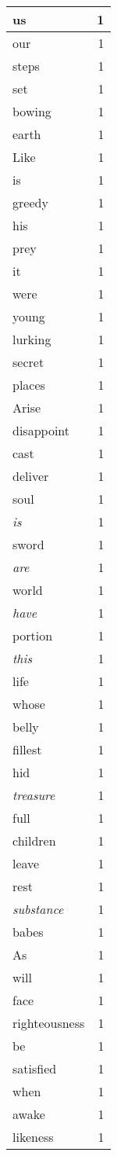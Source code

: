\begin{center}
\begin{longtable}{l|r}
us & 1\\ \hline 
our & 1\\ \hline 
steps & 1\\ \hline 
set & 1\\ \hline 
bowing & 1\\ \hline 
earth & 1\\ \hline 
Like & 1\\ \hline 
is & 1\\ \hline 
greedy & 1\\ \hline 
his & 1\\ \hline 
prey & 1\\ \hline 
it & 1\\ \hline 
were & 1\\ \hline 
young & 1\\ \hline 
lurking & 1\\ \hline 
secret & 1\\ \hline 
places & 1\\ \hline 
Arise & 1\\ \hline 
disappoint & 1\\ \hline 
cast & 1\\ \hline 
deliver & 1\\ \hline 
soul & 1\\ \hline 
\emph{is} & 1\\ \hline 
sword & 1\\ \hline 
\emph{are} & 1\\ \hline 
world & 1\\ \hline 
\emph{have} & 1\\ \hline 
portion & 1\\ \hline 
\emph{this} & 1\\ \hline 
life & 1\\ \hline 
whose & 1\\ \hline 
belly & 1\\ \hline 
fillest & 1\\ \hline 
hid & 1\\ \hline 
\emph{treasure} & 1\\ \hline 
full & 1\\ \hline 
children & 1\\ \hline 
leave & 1\\ \hline 
rest & 1\\ \hline 
\emph{substance} & 1\\ \hline 
babes & 1\\ \hline 
As & 1\\ \hline 
will & 1\\ \hline 
face & 1\\ \hline 
righteousness & 1\\ \hline 
be & 1\\ \hline 
satisfied & 1\\ \hline 
when & 1\\ \hline 
awake & 1\\ \hline 
likeness & 1\\ \hline 
\end{longtable}
\end{center}



